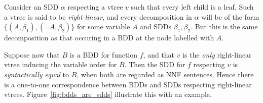 \documentclass[11pt]{report}
\begin{document}
Consider an SDD $\alpha$ respecting a vtree $v$ such that every left child is a leaf. Such a vtree is said to be \textit{right-linear}, and every decomposition in $\alpha$ will be of the form $\{(A, \beta_1), (\lnot A, \beta_2)\}$ for some variable $A$ and SDDs $\beta_1, \beta_2$. 
But this is the same decomposition as that occuring in a BDD at the node labelled with $A$.

Suppose now that $B$ is a BDD for function $f$, and that $v$ is the \textit{only} right-linear vtree inducing the variable order for $B$. Then the SDD for $f$ respecting $v$ is \textit{syntactically equal} to $B$, when both are regarded as NNF sentences. Hence there is a one-to-one correspondence between BDDs and SDDs respecting right-linear vtrees. 
Figure~\ref{fig:bdds_are_sdds} illustrate this with an example. 
\end{document}
